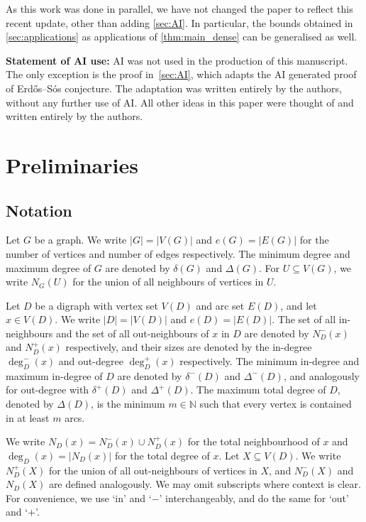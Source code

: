 \documentclass[11pt]{article}
\numberwithin{equation}{section}
\def\NN{\mathbb N}
\theoremstyle{definition}
\begin{document}
As this work was done in parallel, we have not changed the paper to reflect this recent update, other than adding \cref{sec:AI}. In particular, the bounds obtained in \cref{sec:applications} as applications of \cref{thm:main_dense} can be generalised as well.


\textbf{Statement of AI use:}
AI was not used in the production of this manuscript. The only exception is the proof in~\cref{sec:AI}, which adapts
the AI generated proof of Erd\H{o}s--S\'{o}s conjecture. The adaptation was written entirely by the authors,
without any further use of AI. All other ideas in this paper were thought of and written entirely by the authors.


\section{Preliminaries}

\subsection{Notation}
Let $G$ be a graph. We write $|G| = |V(G)|$ and $e(G) = |E(G)|$ for the number of vertices and number of edges respectively. The minimum degree and maximum degree of $G$ are denoted by $\delta(G)$ and $\Delta(G)$. For $U\subseteq V(G)$, we write $N_G(U)$ for the union of all neighbours of vertices in $U$.

Let $D$ be a digraph with vertex set $V(D)$ and arc set $E(D)$, and let $x\in V(D)$. We write $|D| = |V(D)|$ and $e(D) = |E(D)|$.
The set of all in-neighbours and the set of all out-neighbours of $x$ in $D$ are denoted by $N_D^-(x)$ and $N_D^+(x)$ respectively, and their sizes are denoted by the in-degree $\deg_D^-(x)$ and out-degree $\deg_D^+(x)$ respectively. The minimum in-degree and maximum in-degree of $D$ are denoted by $\delta^-(D)$ and $\Delta^-(D)$, and analogously for out-degree with $\delta^+(D)$ and $\Delta^+(D)$. The maximum total degree of $D$, denoted by $\Delta(D)$, is the minimum $m\in \NN$ such that every vertex is contained in at least $m$ arcs.


We write $N_D(x) = N_D^-(x)\cup N_D^+(x)$ for the total neighbourhood of $x$ and $\deg_D(x) = |N_D(x)|$ for the total degree of $x$. 
Let $X\subseteq V(D)$. We write $N^+_D(X)$ for the union of all out-neighbours of vertices in $X$, and $N^-_D(X)$ and $N_D(X)$ are defined analogously.
We may omit subscripts where context is clear.
For convenience, we use `in' and `$-$' interchangeably, and do the same for `out' and `$+$'.
\end{document}
